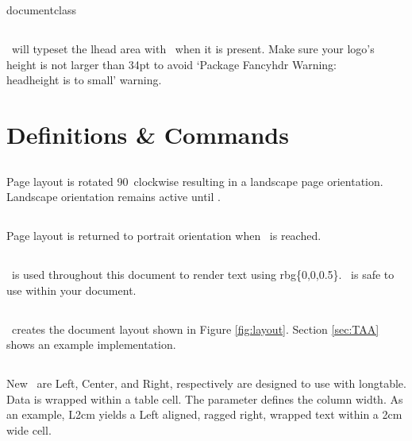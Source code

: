 documentclass\documentclass[12pt]{tlc-article}
\begin{document}

\subsection{\tlcLG}
\tlcA\ will typeset the lhead area with \tlcLG\ when it is present. Make sure
your logo's height is not larger than 34pt to avoid `Package Fancyhdr Warning:
\\headheight is to small' warning.


\clearpage
\section{Definitions \& Commands}
\subsection{\tlcBL}
Page layout is rotated 90\textdegree\ clockwise resulting in a landscape page
orientation.  Landscape orientation remains active until \tlcEL.

\subsection{\tlcEL}
Page layout is returned to portrait orientation when \tlcEL\ is reached.

\subsection{\tlcDB}
\tlcDB\ is used throughout this document to render text using rbg\{0,0,0.5\}. 
\tlcDB\ is safe to use within your document.

\subsection{\tlcTOC}
\tlcTOC\ creates the document layout shown in Figure \ref{fig:layout}.  Section
\ref{sec:TAA} shows an example implementation.

\subsection{\tlcNCT}
New \tlcNCT\ are Left, Center, and Right, respectively are
designed to use with longtable.  Data is wrapped within a table cell.   The
parameter defines the column width.  As an example, L{2cm} yields a Left
aligned, ragged right, wrapped text within a 2cm wide cell.  
\end{document}
